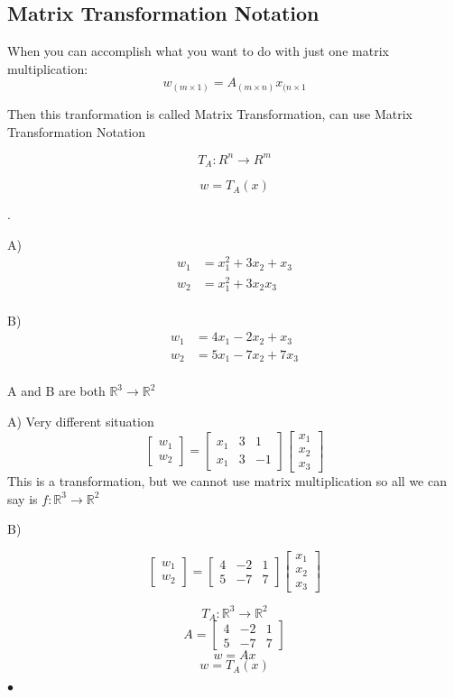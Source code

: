 \subsection{Matrix Transformation Notation}%
\label{sub:matrix_transformation}

When you can accomplish what you want to do with just one matrix multiplication:
	\[w_{(m\times 1)} = A_{(m\times n)}x_{(n\times 1}\]

Then this tranformation is called Matrix Transformation, can use Matrix Transformation Notation

\[T_{A}: R^{n} \to R^{m}\]

\[w = T_{A}(x)\]

\begin{example}.

	A)
	\begin{align*}
		w_1 &= x_1^2 + 3x_2 + x_3 \\
		w_2 &= x_1^2 + 3x_2 x_3 \\
	\end{align*}

	B)
	\begin{align*}
		w_1 &=  4x_1 -2x_2 + x_3 \\
		w_2 &= 5x_1 -7x_2 + 7x_3 \\
	\end{align*}

	A and B are both $\mathbb{R}^3 \to \mathbb{R}^2$

	A) Very different situation
	\[\begin{bmatrix} w_1 \\ w_2 \end{bmatrix} = \begin{bmatrix} x_1 & 3 & 1 \\ x_1 & 3 & -1 \end{bmatrix}
	\begin{bmatrix} x_1 \\ x_2 \\ x_3 \end{bmatrix} \]
	This is a transformation, but we cannot use matrix multiplication so
	all we can say is $f: \mathbb{R}^3 \to \mathbb{R}^2$


	B)

	\[\begin{bmatrix} w_1 \\ w_2 \end{bmatrix} = \begin{bmatrix} 4 & -2 & 1 \\ 5 & -7 & 7 \end{bmatrix}
	\begin{bmatrix} x_1 \\ x_2 \\ x_3 \end{bmatrix} \]

	\[T_{A}: \mathbb{R}^3 \to \mathbb{R}^2\]
	\[A = \begin{bmatrix} 4 & -2 & 1 \\ 5 & -7 & 7 \end{bmatrix} \]
	\[w = Ax \]
	\[w = T_{A}(x)\]

\smallskip\hfill$\bullet$\end{example}


